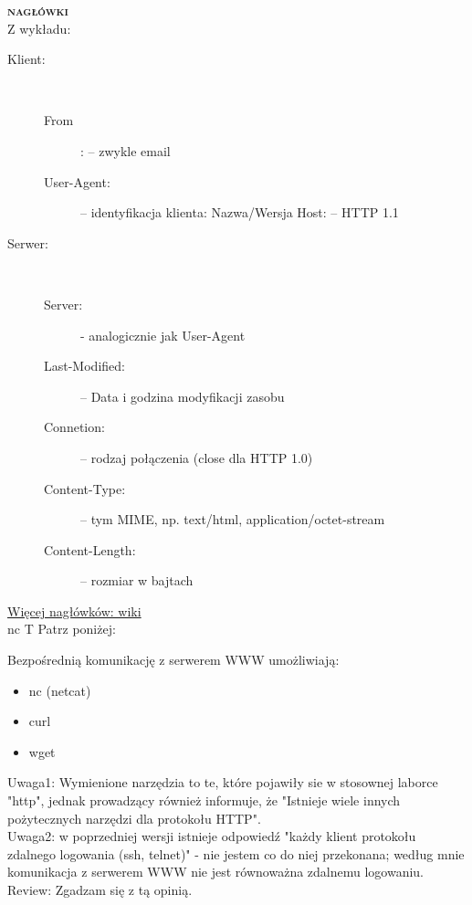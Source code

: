 \textsc{\textbf{nagłówki}}\\
Z wykładu:
\begin{description}

\item[Klient:] \hfill \\
	\begin{description}
	\item[From]: – zwykle email
	\item[User-Agent:] – identyfikacja klienta: Nazwa/Wersja Host: – HTTP 1.1
	\end{description}
\item[Serwer:] \hfill \\
	\begin{description}
		\item[Server:] - analogicznie jak User-Agent
		\item[Last-Modified:] – Data i godzina modyfikacji zasobu 
		\item[Connetion:] – rodzaj połączenia (close dla HTTP 1.0)
		\item[Content-Type:] – tym MIME, np. text/html, application/octet-stream
		\item[Content-Length:] – rozmiar w bajtach
	\end{description}
\end{description}
\href{http://www.wikiwand.com/pl/Lista_nag%C5%82%C3%B3wk%C3%B3w_HTTP}{Więcej nagłówków: wiki} 
\\




\vspace{0.4cm}
\noindent 
{nc}
{T}
{Patrz poniżej:}
{\\}

Bezpośrednią komunikację z serwerem WWW umożliwiają:
\begin{itemize}
\item{nc (netcat)} 
\item{curl} 
\item{wget} 
\end{itemize}

\vspace{0.2cm}
\noindent
Uwaga1: Wymienione narzędzia to te, które pojawiły sie w stosownej laborce "http", jednak prowadzący również informuje, że "Istnieje wiele innych pożytecznych narzędzi dla protokołu HTTP".\\

\vspace{0.2cm}
\noindent
Uwaga2: w poprzedniej wersji istnieje odpowiedź "każdy klient protokołu zdalnego logowania (ssh, telnet)" - nie jestem co do niej przekonana; według mnie komunikacja z serwerem WWW nie jest równoważna zdalnemu logowaniu.\\
Review: Zgadzam się z tą opinią.
 


